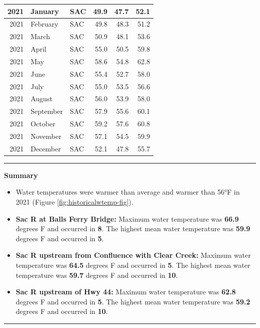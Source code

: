 \documentclass[
]{book}
\providecommand{\tightlist}{%
  \setlength{\itemsep}{0pt}\setlength{\parskip}{0pt}}
\theoremstyle{definition}
\theoremstyle{definition}
\theoremstyle{definition}
\theoremstyle{definition}
\theoremstyle{remark}
\begin{document}
\begin{table}
\begin{tabular}[t]{rllrrr}
\hline
2021 & January & SAC & 49.9 & 47.7 & 52.1\\
\hline
2021 & February & SAC & 49.8 & 48.3 & 51.2\\
\hline
2021 & March & SAC & 50.9 & 48.1 & 53.6\\
\hline
2021 & April & SAC & 55.0 & 50.5 & 59.8\\
\hline
2021 & May & SAC & 58.6 & 54.8 & 62.8\\
\hline
2021 & June & SAC & 55.4 & 52.7 & 58.0\\
\hline
2021 & July & SAC & 55.0 & 53.5 & 56.6\\
\hline
2021 & August & SAC & 56.0 & 53.9 & 58.0\\
\hline
2021 & September & SAC & 57.9 & 55.6 & 60.1\\
\hline
2021 & October & SAC & 59.2 & 57.6 & 60.8\\
\hline
2021 & November & SAC & 57.1 & 54.5 & 59.9\\
\hline
2021 & December & SAC & 52.1 & 47.8 & 55.7\\
\hline
\end{tabular}
\end{table}

\begin{center}\rule{0.5\linewidth}{0.5pt}\end{center}

\textbf{Summary}

\begin{itemize}
\tightlist
\item
  Water temperatures were warmer than average and warmer than 56°F in 2021 (Figure \ref{fig:historicalwtemp-fig}).
\item
  \textbf{Sac R at Balls Ferry Bridge:} Maximum water temperature was \textbf{66.9} degrees F and occurred in \textbf{8}. The highest mean water temperature was \textbf{59.9} degrees F and occurred in \textbf{5}.
\item
  \textbf{Sac R upstream from Confluence with Clear Creek:} Maximum water temperature was \textbf{64.5} degrees F and occurred in \textbf{5}. The highest mean water temperature was \textbf{59.7} degrees F and occurred in \textbf{10}.
\item
  \textbf{Sac R upstream of Hwy 44:} Maximum water temperature was \textbf{62.8} degrees F and occurred in \textbf{5}. The highest mean water temperature was \textbf{59.2} degrees F and occurred in \textbf{10}.
\end{itemize}

\begin{center}\rule{0.5\linewidth}{0.5pt}\end{center}
\end{document}
